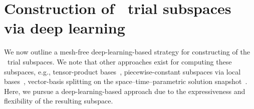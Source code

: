 \documentclass[3p,computermodern,10pt]{elsarticle}
\begin{document}
%
\section{Construction of \parametricSpaceTimeAcronym\ trial subspaces via deep learning}
We now outline a mesh-free deep-learning-based strategy for constructing of the \parametricSpaceTimeAcronym\ trial subspaces. We note that other approaches exist for computing these subspaces, e.g., tensor-product bases~\cite{choi_stlspg}, piecewise-constant subspaces via local bases~\cite{}, vector-basis splitting on the space--time--parametric solution snapshot~\cite{carlberg_hadaptation,ETTER2020112931}. Here, we pursue a deep-learning-based approach due to the expressiveness and flexibility of the resulting subspace.
\end{document}
